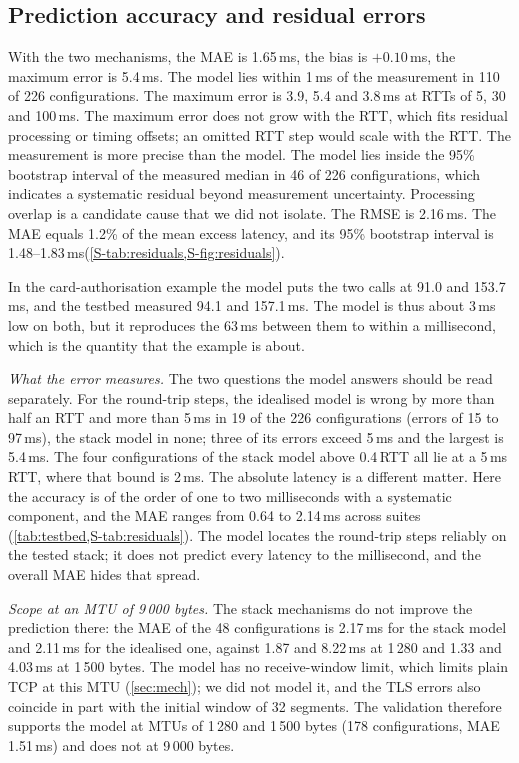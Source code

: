 \documentclass[preprint,12pt]{elsarticle}
\newcommand{\ms}{\,ms\xspace}
\begin{document}
\subsection{Prediction accuracy and residual errors}
With the two mechanisms, the MAE is 1.65\ms, the bias is $+0.10$\ms, the maximum error is 5.4\ms. The model lies within 1\ms of the measurement in 110 of 226 configurations. The maximum error is 3.9, 5.4 and 3.8\ms at RTTs of 5, 30 and 100\ms. The maximum error does not grow with the RTT, which fits residual processing or timing offsets; an omitted RTT step would scale with the RTT. The measurement is more precise than the model. The model lies inside the 95\% bootstrap interval of the measured median in 46 of 226 configurations, which indicates a systematic residual beyond measurement uncertainty. Processing overlap is a candidate cause that we did not isolate. The RMSE is 2.16\ms. The MAE equals 1.2\% of the mean excess latency, and its 95\% bootstrap interval is 1.48--1.83\ms (\cref{S-tab:residuals,S-fig:residuals}).

In the card-authorisation example the model puts the two calls at 91.0 and 153.7\ms, and the testbed measured 94.1 and 157.1\ms. The model is thus about 3\ms low on both, but it reproduces the 63\ms between them to within a millisecond, which is the quantity that the example is about.

\emph{What the error measures.} The two questions the model answers should be read separately. For the round-trip steps, the idealised model is wrong by more than half an RTT and more than 5\ms in 19 of the 226 configurations (errors of 15 to 97\ms), the stack model in none; three of its errors exceed 5\ms and the largest is 5.4\ms. The four configurations of the stack model above 0.4\,RTT all lie at a 5\ms RTT, where that bound is 2\ms. The absolute latency is a different matter. Here the accuracy is of the order of one to two milliseconds with a systematic component, and the MAE ranges from 0.64 to 2.14\ms across suites (\cref{tab:testbed,S-tab:residuals}). The model locates the round-trip steps reliably on the tested stack; it does not predict every latency to the millisecond, and the overall MAE hides that spread.

\emph{Scope at an MTU of 9\,000 bytes.} The stack mechanisms do not improve the prediction there: the MAE of the 48 configurations is 2.17\ms for the stack model and 2.11\ms for the idealised one, against 1.87 and 8.22\ms at 1\,280 and 1.33 and 4.03\ms at 1\,500 bytes. The model has no receive-window limit, which limits plain TCP at this MTU (\cref{sec:mech}); we did not model it, and the TLS errors also coincide in part with the initial window of 32 segments. The validation therefore supports the model at MTUs of 1\,280 and 1\,500 bytes (178 configurations, MAE 1.51\ms) and does not at 9\,000 bytes.
\end{document}
